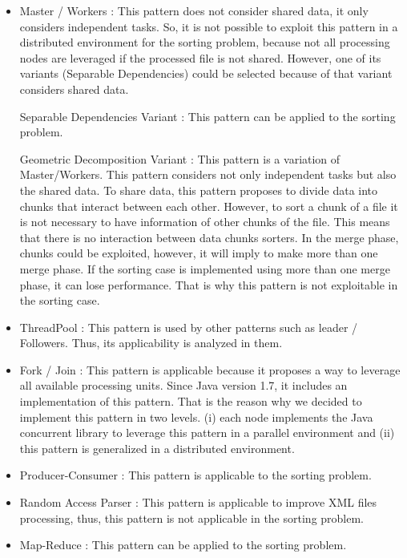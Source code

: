 \begin{itemize}
	\item Master / Workers : This pattern does not consider shared data, it only considers independent tasks. So, it is not possible to exploit this pattern in a distributed environment for the sorting problem, because not all processing nodes are leveraged if the processed file is not shared. However, one of its variants (Separable Dependencies) could be selected because of that variant considers shared data.
	
	\subitem Separable Dependencies Variant : This pattern can be applied to the sorting problem. 
	
	\subitem Geometric Decomposition Variant : This pattern is a variation of Master/Workers. This pattern considers not only independent tasks but also the shared data. To share data, this pattern proposes to divide data into chunks that interact between each other. However, to sort a chunk of a file it is not necessary to have information of other chunks of the file. This means that there is no interaction between data chunks sorters. In the merge phase, chunks could be exploited, however, it will imply to make more than one merge phase. If the sorting case is implemented using more than one merge phase, it can lose performance. That is why this pattern is not exploitable in the sorting case.
	
	\item ThreadPool : This pattern is used by other patterns such as leader / Followers. Thus, its applicability is analyzed in them.
	
	\item Fork / Join : This pattern is applicable because it proposes a way to leverage all available processing units. Since Java version 1.7, it includes an implementation of this pattern. That is the reason why we decided to implement this pattern in two levels. (i) each node implements the Java concurrent library to leverage this pattern in a parallel environment and (ii) this pattern is generalized in a distributed environment.
	
	\item Producer-Consumer : This pattern is applicable to the sorting problem.
	
	\item Random Access Parser : This pattern is applicable to improve XML files processing, thus, this pattern is not applicable in the sorting problem.
	
	\item Map-Reduce : This pattern can be applied to the sorting problem.
	

\end{itemize}

